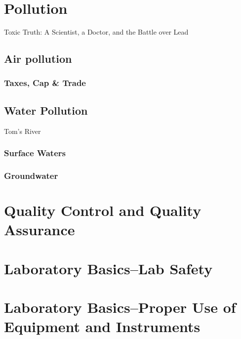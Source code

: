 \documentclass{tufte-book}\usepackage[]{graphicx}\usepackage[]{xcolor}
\begin{document}
\chapter{Pollution}

Toxic Truth: A Scientist, a Doctor, and the Battle over Lead

\section{Air pollution}

\subsection{Taxes, Cap \& Trade}



\section{Water Pollution}

Tom's River

\subsection{Surface Waters}

\subsection{Groundwater}









\backmatter \appendix

\chapter{Quality Control and Quality Assurance}

\chapter{Laboratory Basics--Lab Safety}

\chapter{Laboratory Basics--Proper Use of Equipment and Instruments}
\end{document}
